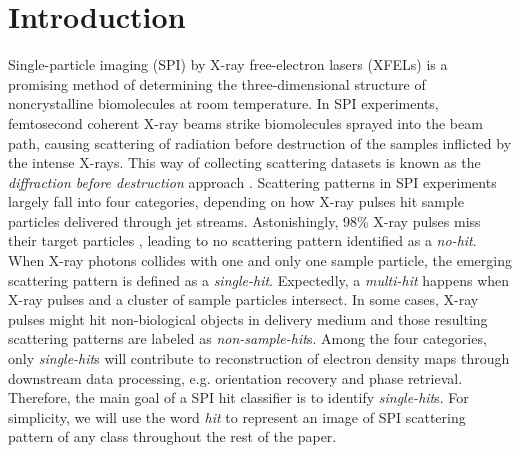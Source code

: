 




















\section{Introduction}


Single-particle imaging (SPI) by X-ray free-electron lasers (XFELs) is a
promising method of determining the three-dimensional structure of
noncrystalline biomolecules at room temperature.  In SPI experiments,
femtosecond coherent X-ray beams strike biomolecules sprayed into the beam path,
causing scattering of radiation before destruction of the samples inflicted by
the intense X-rays.  This way of collecting scattering datasets is known as the
\textit{diffraction before destruction} approach
\cite{neutzePotentialBiomolecularImaging2000,
chapmanFemtosecondDiffractiveImaging2006,seibertSingleMimivirusParticles2011,
aquilaLinacCoherentLight2015,reddyCoherentSoftXray2017a}.  Scattering patterns
in SPI experiments largely fall into four categories, depending on how X-ray
pulses hit sample particles delivered through jet streams.  Astonishingly, 98\%
X-ray pulses miss their target particles
\cite{shiEvaluationPerformanceClassification2019}, leading to no scattering
pattern identified as a \textit{no-hit}.  When X-ray photons collides with one
and only one sample particle, the emerging scattering pattern is defined as a
\textit{single-hit}. Expectedly, a \textit{multi-hit} happens when X-ray pulses
and a cluster of sample particles intersect. In some cases, X-ray pulses might
hit non-biological objects in delivery medium and those resulting scattering
patterns are labeled as \textit{non-sample-hit}s.  Among the four categories,
only \textit{single-hit}s will contribute to reconstruction of electron density
maps through downstream data processing, e.g. orientation recovery and phase
retrieval.  Therefore, the main goal of a SPI hit classifier is to identify
\textit{single-hit}s.  For simplicity, we will use the word \textit{hit} to
represent an image of SPI scattering pattern of any class throughout the rest of the paper.  



